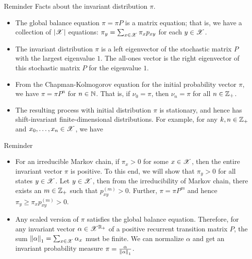\documentclass[12pt,aspectratio=169]{beamer}
\begin{document}
\begin{frame}
\begin{block}{Reminder} 
Facts about the invariant distribution $\pi$. 
\begin{itemize}
\item The global balance equation $\pi = \pi P$ is a matrix equation; that is, we have a collection of $\left\lvert\mathscr{X}\right\rvert$ equations: $\pi_y = \sum_{x \in \mathscr{X}}\pi_x p_{xy}$ for each $y \in \mathscr{X}$.

\item<2-> The invariant distribution $\pi$ is a left eigenvector of the stochastic matrix $P$ with the largest eigenvalue $1$. The all-ones vector is the right eigenvector of this stochastic matrix $P$ for the eigenvalue $1$.

\item<3-> From the Chapman-Kolmogorov equation for the initial probability vector $\pi$, we have $\pi = \pi P^n$ for $n \in \mathbb{N}$. That is, if $\nu_0 = \pi$, then $\nu_n = \pi$ for all $n \in \mathbb{Z}_+$.

\item<4-> The resulting process with initial distribution $\pi$ is stationary, and hence has shift-invariant finite-dimensional distributions. For example, for any $k, n \in \mathbb{Z}_+$ and $x_0, \dots, x_n \in \mathscr{X}$, we have
\end{itemize}
\end{block}
\end{frame}


\begin{frame}
\begin{block}{Reminder} 
\begin{itemize}
\item For an irreducible Markov chain, if $\pi_x > 0$ for some $x \in \mathscr{X}$, then the entire invariant vector $\pi$ is positive. 
To this end, we will show that $\pi_y > 0$ for all states $y \in \mathscr{X}$. 
Let $y \in \mathscr{X}$, then from the irreducibility of Markov chain, there exists an $m \in \mathbb{Z}_+$ such that $p_{xy}^{(m)} > 0$. 
Further, $\pi = \pi P^m$ and hence $\pi_y \ge \pi_x p_{xy}^{(m)} > 0$.  

\item<2-> Any scaled version of $\pi$ satisfies the global balance equation. 
Therefore, for any invariant vector $\alpha \in \mathscr{X}^{\mathbb{R}_+}$ of a positive recurrent transition matrix $P$,  
the sum $\left\lVert\alpha\right\rVert_1 = \sum_{x \in \mathscr{X}}\alpha_x$ must be finite. 
We can normalize $\alpha$ and get an invariant probability measure $\pi = \frac{\alpha}{\left\lVert\alpha\right\rVert_1}$. 
\end{itemize}
\end{block}
\end{frame}
\end{document}
